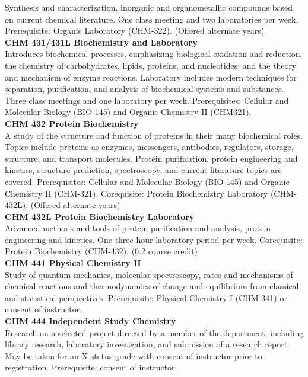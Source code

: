 \documentclass[
  letterpaper,
]{scrbook}
\begin{document}
Synthesis and characterization, inorganic and organometallic compounds
based on current chemical literature. One class meeting and two
laboratories per week. Prerequisite: Organic Laboratory (CHM-322).
(Offered alternate years)\\
\textbf{CHM 431/431L Biochemistry and Laboratory}\\
Introduces biochemical processes, emphasizing biological oxidation and
reduction; the chemistry of carbohydrates, lipids, proteins, and
nucleotides; and the theory and mechanism of enzyme reactions.
Laboratory includes modern techniques for separation, purification, and
analysis of biochemical systems and substances. Three class meetings and
one laboratory per week. Prerequisites: Cellular and Molecular Biology
(BIO-145) and Organic Chemistry II (CHM321).\\
\textbf{CHM 432 Protein Biochemistry}\\
A study of the structure and function of proteins in their many
biochemical roles. Topics include proteins as enzymes, messengers,
antibodies, regulators, storage, structure, and transport molecules.
Protein purification, protein engineering and kinetics, structure
prediction, spectroscopy, and current literature topics are covered.
Prerequisites: Cellular and Molecular Biology (BIO-145) and Organic
Chemistry II (CHM-321). Corequisite: Protein Biochemistry Laboratory
(CHM-432L). (Offered alternate years)\\
\textbf{CHM 432L Protein Biochemistry Laboratory}\\
Advanced methods and tools of protein purification and analysis, protein
engineering and kinetics. One three-hour laboratory period per week.
Corequisite: Protein Biochemistry (CHM-432). (0.2 course credit)\\
\textbf{CHM 441 Physical Chemistry II}\\
Study of quantum mechanics, molecular spectroscopy, rates and mechanisms
of chemical reactions and thermodynamics of change and equilibrium from
classical and statistical perspectives. Prerequisite: Physical Chemistry
I (CHM-341) or consent of instructor.\\
\textbf{CHM 444 Independent Study Chemistry}\\
Research on a selected project directed by a member of the department,
including library research, laboratory investigation, and submission of
a research report. May be taken for an X status grade with consent of
instructor prior to registration. Prerequisite: consent of instructor.\\
\end{document}
